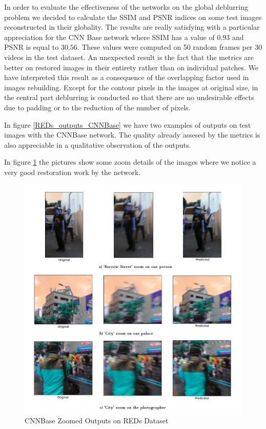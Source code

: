 \documentclass[12pt,a4paper]{report}
\begin{document}
In order to evaluate the effectiveness of the networks on the global deblurring problem we decided to calculate the SSIM and PSNR indices on some test images reconstructed in their globality. The results are really satisfying with a particular appreciation for the CNN Base network where SSIM has a value of $0.93$ and PSNR is equal to $30.56$. These values were computed on 50 random frames per 30 videos in the test dataset. An unexpected result is the fact that the metrics are better on  restored images in their entirety rather than on individual patches. We have interpreted this result as a consequence of the overlapping factor used in images rebuilding. Except for the contour pixels in the images at original size, in the central part deblurring is conducted so that there are no undesirable effects due to padding or to the reduction of the number of pixels.


In figure \ref{REDs_outputs_CNNBase} we have two examples of outputs on test images with the CNNBase network. The quality already assesed by the metrics is also appreciable in a qualitative observation of the outputs. 

In figure \ref{REDs_outputs_CNNBase_Zoom} the pictures show some zoom details of the images where we notice a very good restoration work by the network.

\begin{figure}[hptb]
\centering
\includegraphics[scale=0.35]{REDs_CNNBase_Outputs_Zoom.png} 
\caption{CNNBase Zoomed Outputs on REDs Dataset}
\label{REDs_outputs_CNNBase_Zoom}
\end{figure}
\end{document}
